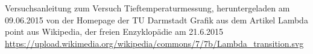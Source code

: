 \documentclass[bigchapter,colorback,accentcolor=tud4b,linedtoc,11pt]{tudreport}
\begin{document}
\cleardoublepage{}
\newpage
\begin{thebibliography}{100}
   Versuchsanleitung zum Versuch Tieftemperaturmessung, heruntergeladen am 09.06.2015 von der Homepage der TU Darmstadt
   Grafik aus dem Artikel Lambda point aus Wikipedia, der freien Enzyklopädie am 21.6.2015 \url{https://upload.wikimedia.org/wikipedia/commons/7/7b/Lambda_transition.svg}
  
\end{thebibliography}
\end{document}
